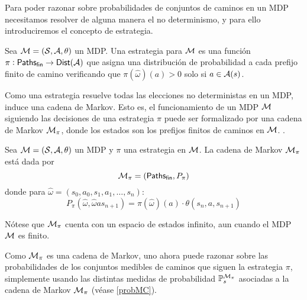 Para poder razonar sobre probabilidades de conjuntos de caminos en un MDP
necesitamos resolver de alguna manera el no determinismo, y para ello
introduciremos el concepto de estrategia.

\begin{definition}
	Sea $\mathcal{M} = (\mathcal{S}, \mathcal{A}, \theta)$ un MDP. Una estrategia para $\mathcal{M}$ es una función $\pi: \textsf{Paths}_\textsf{fin} \rightarrow \mathsf{Dist} (\mathcal{A})$ que asigna una distribución de probabilidad a cada prefijo finito de camino verificando que $\pi(\hat \omega) (a) > 0$ solo si $a \in \mathcal{A}(s)$.
\end{definition}


Como una estrategia resuelve todas las elecciones no deterministas en un MDP,
induce una cadena de Markov. Esto es, el funcionamiento de un MDP $\mathcal{M}$
siguiendo las decisiones de una estrategia $\pi$ puede ser formalizado por una
cadena de Markov $\mathcal{M}_\pi$, donde los estados son los prefijos finitos de
caminos en $\mathcal{M}$. .

\begin{definition}
	Sea $\mathcal{M} = (\mathcal{S}, \mathcal{A}, \theta)$ un MDP y $\pi$ una estrategia en $\mathcal{M}$. La cadena de Markov $\mathcal{M}_\pi$ está dada por
	$$\mathcal{M}_\pi = (\textsf{Paths}_\textsf{fin}, P_\pi)$$
	donde para $\hat \omega = (s_0, a_0, s_1, a_1, \dots, s_n)$:
	$$P_\pi(\hat \omega, \hat \omega a s_{n+1}) = \pi(\hat \omega)(a) \cdot \theta(s_n, a, s_{n+1})$$
\end{definition}

Nótese que $\mathcal{M}_\pi$ cuenta con un espacio de estados infinito, aun cuando el
MDP $\mathcal{M}$ es finito.

Como $\mathcal{M}_\pi$ es una cadena de Markov, uno ahora puede razonar sobre las
probabilidades de los conjuntos medibles de caminos que siguen la estrategia
$\pi$, simplemente usando las distintas medidas de probabilidad
$\mathbb{P}^{\mathcal{M}_\pi}_s$ asociadas a la cadena de Markov $\mathcal{M}_\pi$ (véase
\ref{probMC}).


